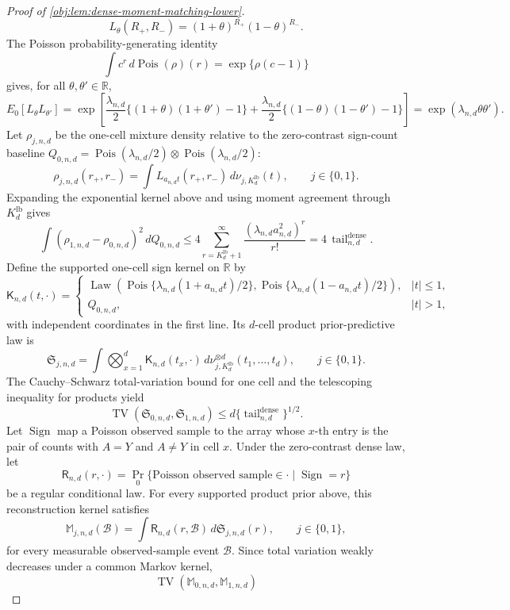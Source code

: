 \documentclass[11pt]{article}
\begin{document}
\begin{proof}[Proof of \cref{obj:lem:dense-moment-matching-lower}]
\[
L_\theta(R_+,R_-)
=
(1+\theta)^{R_+}(1-\theta)^{R_-}.
\]
The Poisson probability-generating identity
\[
\int c^r\,d\operatorname{Pois}(\rho)(r)=\exp\{\rho(c-1)\}
\]
gives, for all \(\theta,\theta'\in\mathbb R\),
\[
E_0[L_\theta L_{\theta'}]
=
\exp\!\left[
\frac{\lambda_{n,d}}2\{(1+\theta)(1+\theta')-1\}
+
\frac{\lambda_{n,d}}2\{(1-\theta)(1-\theta')-1\}
\right]
=
\exp(\lambda_{n,d}\theta\theta').
\]
Let \(\rho_{j,n,d}\) be the one-cell mixture density relative to the zero-contrast sign-count baseline \(Q_{0,n,d}=\operatorname{Pois}(\lambda_{n,d}/2)\otimes\operatorname{Pois}(\lambda_{n,d}/2)\):
\[
\rho_{j,n,d}(r_+,r_-)
=
\int L_{a_{n,d}t}(r_+,r_-)\,d\nu_{j,K_d^{\mathrm{lb}}}(t),
\qquad j\in\{0,1\}.
\]
Expanding the exponential kernel above and using moment agreement through \(K_d^{\mathrm{lb}}\) gives
\[
\int (\rho_{1,n,d}-\rho_{0,n,d})^2\,dQ_{0,n,d}
\le
4\sum_{r=K_d^{\mathrm{lb}}+1}^{\infty}
\frac{(\lambda_{n,d}a_{n,d}^2)^r}{r!}
=
4\,\operatorname{tail}_{n,d}^{\mathrm{dense}}.
\]
Define the supported one-cell sign kernel on \(\mathbb R\) by
\[
\mathsf K_{n,d}(t,\cdot)
=
\begin{cases}
\operatorname{Law}\!\left(
\operatorname{Pois}\{\lambda_{n,d}(1+a_{n,d}t)/2\},
\operatorname{Pois}\{\lambda_{n,d}(1-a_{n,d}t)/2\}
\right), & |t|\le1,\\[0.4ex]
Q_{0,n,d}, & |t|>1,
\end{cases}
\]
with independent coordinates in the first line. Its \(d\)-cell product prior-predictive law is
\[
\mathfrak S_{j,n,d}
=
\int
\bigotimes_{x=1}^d \mathsf K_{n,d}(t_x,\cdot)\,
d\nu_{j,K_d^{\mathrm{lb}}}^{\otimes d}(t_1,\ldots,t_d),
\qquad j\in\{0,1\}.
\]
The Cauchy--Schwarz total-variation bound for one cell and the telescoping inequality for products yield
\[
\operatorname{TV}(\mathfrak S_{0,n,d},\mathfrak S_{1,n,d})
\le
d\{\operatorname{tail}_{n,d}^{\mathrm{dense}}\}^{1/2}.
\]
Let \(\operatorname{Sign}\) map a Poisson observed sample to the array whose \(x\)-th entry is the pair of counts with \(A=Y\) and \(A\ne Y\) in cell \(x\). Under the zero-contrast dense law, let
\[
\mathsf R_{n,d}(r,\cdot)
=
\Pr_{0}\{\text{Poisson observed sample}\in\cdot\mid \operatorname{Sign}=r\}
\]
be a regular conditional law. For every supported product prior above, this reconstruction kernel satisfies
\[
\mathbb M_{j,n,d}(\mathcal B)
=
\int \mathsf R_{n,d}(r,\mathcal B)\,d\mathfrak S_{j,n,d}(r),
\qquad j\in\{0,1\},
\]
for every measurable observed-sample event \(\mathcal B\). Since total variation weakly decreases under a common Markov kernel,
\[
\operatorname{TV}(\mathbb M_{0,n,d},\mathbb M_{1,n,d})
\]
\end{proof}
\end{document}
